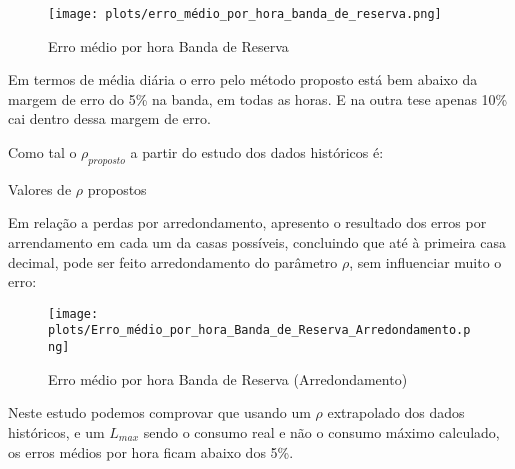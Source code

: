 \begin{figure}[H]
    \centering
    \texttt{[image: plots/erro\_médio\_por\_hora\_banda\_de\_reserva.png]}
    \caption{Erro médio por hora Banda de Reserva}
\end{figure}

Em termos de média diária o erro pelo método proposto está bem abaixo da margem de erro do 5\% na banda, em todas as horas. E na outra tese apenas 10\% cai dentro dessa margem de erro.\par

Como tal o $\rho_{proposto}$ a partir do estudo dos dados  históricos é: \

\begin{table}[H] \centering \caption{Valores de $\rho$ propostos}  \end{table}



Em relação a perdas por arredondamento, apresento o resultado dos erros por arrendamento em cada um da casas possíveis, concluindo que até à primeira casa decimal, pode ser feito arredondamento do parâmetro $\rho$, sem influenciar muito o erro: \\


\begin{figure}[H]
    \centering
    \texttt{[image: plots/Erro\_médio\_por\_hora\_Banda\_de\_Reserva\_Arredondamento.png]}
    \caption{Erro médio por hora Banda de Reserva (Arredondamento)}
\end{figure}



Neste estudo podemos comprovar que usando um $\rho$ extrapolado dos dados históricos, e um $L_{max}$ sendo o consumo real e não o consumo máximo calculado, os erros médios por hora ficam abaixo dos 5\%.\par